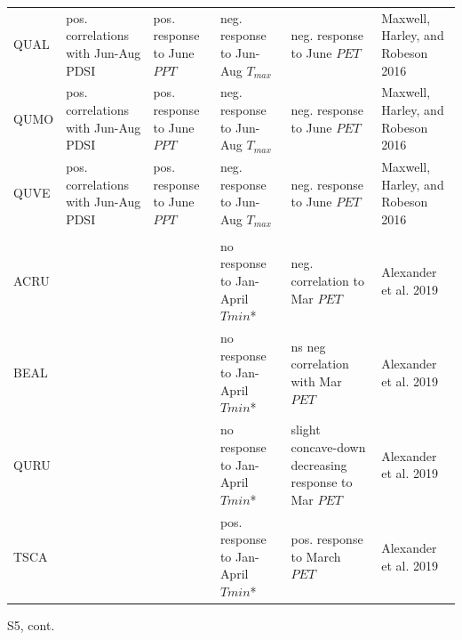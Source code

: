 \documentclass[
]{article}
\begin{document}
\begin{longtable}{l>{\raggedright\arraybackslash}p{2.5cm}>{\raggedright\arraybackslash}p{2.5cm}>{\raggedright\arraybackslash}p{2.5cm}>{\raggedright\arraybackslash}p{2.5cm}>{\raggedright\arraybackslash}p{2cm}}
\hspace{1em}QUAL & pos. correlations with Jun-Aug PDSI & pos. response to June $PPT$ & neg. response to Jun-Aug $T_{max}$ & neg. response to June $PET$ & Maxwell, Harley, and Robeson 2016\\
\hspace{1em}QUMO & pos. correlations with Jun-Aug PDSI & pos. response to June $PPT$ & neg. response to Jun-Aug $T_{max}$ & neg. response to June $PET$ & Maxwell, Harley, and Robeson 2016\\
\hspace{1em}QUVE & pos. correlations with Jun-Aug PDSI & pos. response to June $PPT$ & neg. response to Jun-Aug $T_{max}$ & neg. response to June $PET$ & Maxwell, Harley, and Robeson 2016\\
\addlinespace[1em]
\multicolumn{4}{l}{\textbf{Harvard Forest, Massachusetts, USA}}\\
\hspace{1em}ACRU &  &  & no response to Jan- April $T{min}$* & neg. correlation to Mar $PET$ & Alexander et al. 2019\\
\hspace{1em}BEAL &  &  & no response to Jan- April $T{min}$* & ns neg correlation with Mar $PET$ & Alexander et al. 2019\\
\hspace{1em}QURU &  &  & no response to Jan- April $T{min}$* & slight concave-down decreasing response to Mar $PET$ & Alexander et al. 2019\\
\hspace{1em}TSCA &  &  & pos. response to Jan- April $T{min}$* & pos. response to March $PET$ & Alexander et al. 2019\\
\bottomrule
\end{longtable}
\endgroup{}

\newpage

S5, cont. \begingroup\fontsize{7}{9}\selectfont
\end{document}
